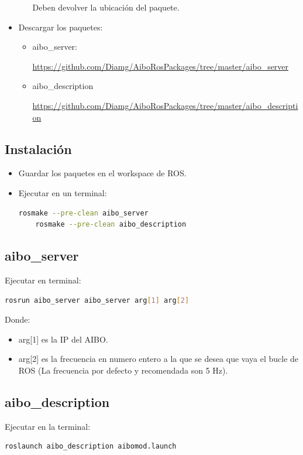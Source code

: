 \documentclass[12pt,a4paper,final,twoside]{article}
\begin{document}
\begin{itemize}
\begin{itemize}
Deben devolver la ubicación del paquete.
\end{itemize}

\item Descargar los paquetes:
\begin{itemize}
\item aibo{\_}server:

\url{https://github.com/Diamg/AiboRosPackages/tree/master/aibo_server}
\item aibo{\_}description

\url{https://github.com/Diamg/AiboRosPackages/tree/master/aibo_description}
\end{itemize}
\end{itemize}

\subsection{Instalación}
\begin{itemize}
\item Guardar los paquetes en el workspace de ROS.
\item Ejecutar en un terminal:
\begin{lstlisting}[language=bash]
	rosmake --pre-clean aibo_server
	rosmake --pre-clean aibo_description
\end{lstlisting}


\end{itemize}
\subsection{aibo{\_}server}
Ejecutar en terminal:
\begin{lstlisting}[language=bash]
	rosrun aibo_server aibo_server arg[1] arg[2]
\end{lstlisting}

Donde:
\begin{itemize}
\item arg[1] es la IP del AIBO.
\item arg[2] es la frecuencia en numero entero a la que se desea que vaya el bucle de ROS (La frecuencia por defecto y recomendada son 5 Hz).
\end{itemize}

\subsection{aibo{\_}description}
Ejecutar en la terminal:
\begin{lstlisting}[language=bash]
	roslaunch aibo_description aibomod.launch
\end{lstlisting}
\end{document}
